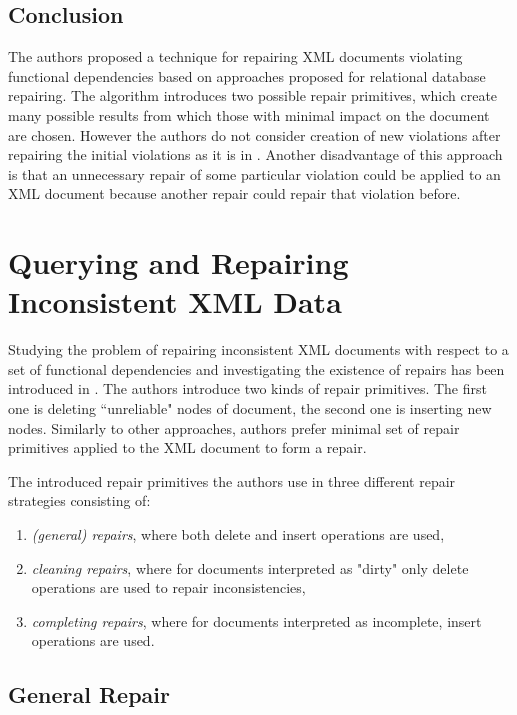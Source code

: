 \subsection{Conclusion}

The authors proposed a technique for repairing XML documents violating functional dependencies based on approaches proposed for relational database repairing. The algorithm introduces two possible repair primitives, which create many possible results from which those with minimal impact on the document are chosen. However the authors do not consider creation of new violations after repairing the initial violations as it is in \cite{ImprovingXML}. Another disadvantage of this approach is that an unnecessary repair of some particular violation could be applied to an XML document because another repair could repair that violation before.

\section{Querying and Repairing Inconsistent XML Data}

Studying the problem of repairing inconsistent XML documents with respect to a set of functional dependencies and investigating the existence of repairs has been introduced in \cite{QueryXML}. The authors introduce two kinds of repair primitives. The first one is deleting ``unreliable" nodes of document, the second one is inserting new nodes. Similarly to other approaches, authors prefer minimal set of repair primitives applied to the XML document to form a repair.

The introduced repair primitives the authors use in three different repair strategies consisting of:
\begin{enumerate}
	\item \textit{(general) repairs}, where both delete and insert operations are used,
	\item \textit{cleaning repairs}, where for documents interpreted as "dirty" only delete operations are used to repair inconsistencies,
	\item \textit{completing repairs}, where for documents interpreted as incomplete, insert operations are used.
\end{enumerate}

\subsection{General Repair}

